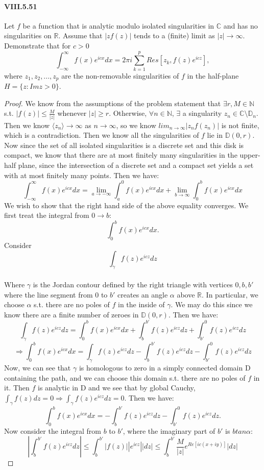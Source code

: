 \documentclass[10pt]{article}
\begin{document}
\maketitle


\paragraph{VIII.5.51} Let $f$ be a function that is analytic modulo isolated singularities in $\mathbb{C}$ and has no singularities on $\mathbb{R}$. Assume that $|zf(z)|$ tends to a (finite) limit as $|z| \rightarrow \infty$. Demonstrate that for $c>0$ 
\[\int_{-\infty}^\infty f(x)e^{icx}dx = 2 \pi i \sum_{k = 1}^p Res[z_k,f(z)e^{icz}] ,\]
where $z_1,z_2, ...,z_p$ are the non-removable singularities of $f$ in the half-plane $H = \{z:Imz > 0\}$. 
\begin{proof}
We know from the assumptions of the problem statement that $\exists r,M \in \mathbb{N}$ s.t. $|f(z)| \leq \frac{M}{|z|}$ whenever $|z| \geq r$. Otherwise, $\forall n \in \mathbb{N}$, $\exists$ a singularity $ z_n \in \mathbb{C} \setminus \mathbb{D}_n$. Then we know $\langle z_n \rangle \to \infty$ as $n \to \infty$, so we know $lim_{n \to \infty}|z_nf(z_n)|$ is not finite, which is a contradiction. Then we know all the singularities of $f$ lie in $\mathbb{D}(0,r)$. Now since the set of all isolated singularities is a discrete set and this disk is compact, we know that there are at most finitely many singularities in the upper-half plane, since the intersection of a discrete set and a compact set yields a set with at most finitely many points. Then we have:  
\[\int_{-\infty}^\infty f(x)e^{icx}dx  = \lim_{a \to -\infty}\int_{a}^0 f(x)e^{icx}dx  + \lim_{b \to \infty}\int_{0}^b f(x)e^{icx}dx \]
We wish to show that the right hand side of the above equality converges. We first treat the integral from $0 \to b$: 
\[\int_{0}^b f(x)e^{icx}dx. \]
Consider
\[\int_\gamma f(z)e^{icz}dz\]\\

Where $\gamma$ is the Jordan contour defined by the right triangle with vertices $0,b,b'$ where the line segment from 0 to $b'$ creates an angle $\alpha$ above $\mathbb{R}$. In particular, we choose $\alpha$ s.t. there are no poles of $f$ in the inside of $\gamma$. We may do this since we know there are a finite number of zeroes in $\mathbb{D}(0,r)$. Then we have: 
\[\int_\gamma f(z)e^{icz}dz = \int_0^bf(x)e^{icx}dx + \int_b^{b'}f(z)e^{icz}dz + \int_{b'}^0 f(z)e^{icz}dz\]
\[\Rightarrow  \int_0^bf(x)e^{icx}dx = \int_\gamma f(z)e^{icz}dz - \int_b^{b'}f(z)e^{icz}dz - \int_{b'}^0 f(z)e^{icz}dz\]
Now, we can see that $\gamma$ is homologous to zero in a simply connected domain D containing the path, and we can choose this domain s.t. there are no poles of $f$ in it. Then $f$ is analytic in D and we see that by global Cauchy, $\int_\gamma f(z)dz = 0 \Rightarrow \int_\gamma f(z)e^{icz}dz = 0$. Then we have: 
\[\int_0^bf(x)e^{icx}dx =  - \int_b^{b'}f(z)e^{icz}dz - \int_{b'}^0 f(z)e^{icz}dz. \]
Now consider the integral from $b$ to $b'$, where the imaginary part of $b'$ is $btan\alpha$: 
\[\left|\int_b^{b'}f(z)e^{icz}dz\right| \leq \int_b^{b'}|f(z)||e^{icz}||dz| \leq \int_b^{b'}\frac{M}{|z|}e^{Re[ic(x+iy)]}|dz|\]



\end{proof}
\end{document}
